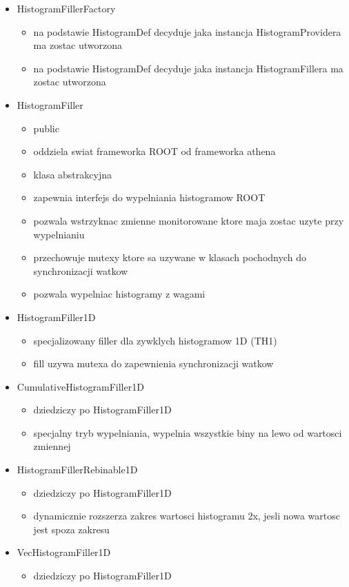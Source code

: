 \begin{itemize}
\item HistogramFillerFactory
	\begin{itemize}
	\item na podstawie HistogramDef decyduje jaka instancja HistogramProvidera ma zostac utworzona
	\item na podstawie HistogramDef decyduje jaka instancja HistogramFillera ma zostac utworzona
	\end{itemize}
\item HistogramFiller
	\begin{itemize}
	\item public
	\item oddziela swiat frameworka ROOT od frameworka athena
	\item klasa abstrakcyjna
	\item zapewnia interfejs do wypelniania histogramow ROOT
	\item pozwala wstrzyknac zmienne monitorowane ktore maja zostac uzyte przy wypelnianiu
	\item przechowuje mutexy ktore sa uzywane w klasach pochodnych do synchronizacji watkow
	\item pozwala wypelniac histogramy z wagami
	\end{itemize}
\item HistogramFiller1D
	\begin{itemize}
	\item specjalizowany filler dla zywklych histogramow 1D (TH1)
	\item fill uzywa mutexa do zapewnienia synchronizacji watkow
	\end{itemize}
\item CumulativeHistogramFiller1D
	\begin{itemize}
	\item dziedziczy po HistogramFiller1D
	\item specjalny tryb wypelniania, wypelnia wszystkie biny na lewo od wartosci zmiennej
	\end{itemize}
\item HistogramFillerRebinable1D
	\begin{itemize}
	\item dziedziczy po HistogramFiller1D
	\item dynamicznie rozszerza zakres wartosci histogramu 2x, jesli nowa wartosc jest spoza zakresu 
	\end{itemize}
\item VecHistogramFiller1D
	\begin{itemize}
	\item dziedziczy po HistogramFiller1D

\end{itemize}
\end{itemize}
